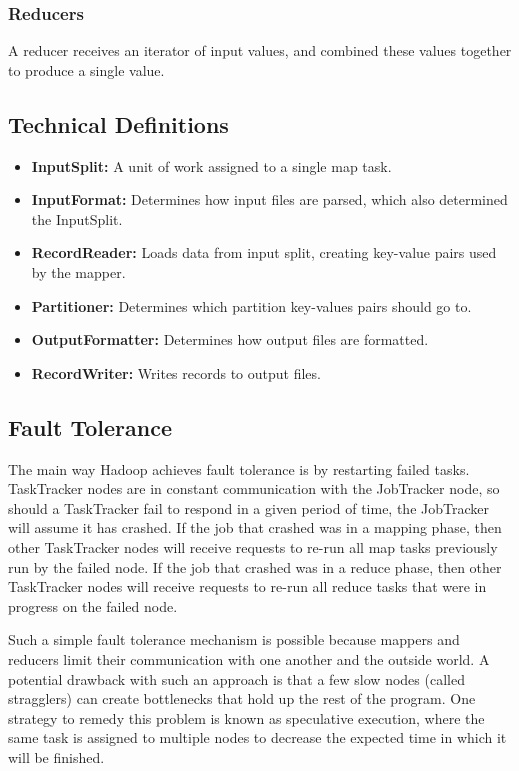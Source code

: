 \documentclass[12pt,titlepage]{article}
\begin{document}
      \subsubsection{Reducers}
        A reducer receives an iterator of input values, and combined these values together to produce a single value.

    \subsection{Technical Definitions}
      \begin{itemize}
        \item \textbf{InputSplit:} A unit of work assigned to a single map task.
        \item \textbf{InputFormat:} Determines how input files are parsed, which also determined the InputSplit.
        \item \textbf{RecordReader:} Loads data from input split, creating key-value pairs used by the mapper.
        \item \textbf{Partitioner:} Determines which partition key-values pairs should go to.
        \item \textbf{OutputFormatter:} Determines how output files are formatted.
        \item \textbf{RecordWriter:} Writes records to output files.
      \end{itemize}

    \subsection{Fault Tolerance}
      The main way Hadoop achieves fault tolerance is by restarting failed tasks. TaskTracker nodes are in constant communication with the JobTracker node, so should
      a TaskTracker fail to respond in a given period of time, the JobTracker will assume it has crashed. If the job that crashed was in a mapping phase, then other
      TaskTracker nodes will receive requests to re-run all map tasks previously run by the failed node. If the job that crashed was in a reduce phase, then other
      TaskTracker nodes will receive requests to re-run all reduce tasks that were in progress on the failed node.

      Such a simple fault tolerance mechanism is possible because mappers and reducers limit their communication with one another and the outside world. A potential
      drawback with such an approach is that a few slow nodes (called stragglers) can create bottlenecks that hold up the rest of the program. One strategy to remedy
      this problem is known as speculative execution, where the same task is assigned to multiple nodes to decrease the expected time in which it will be finished.
\end{document}
